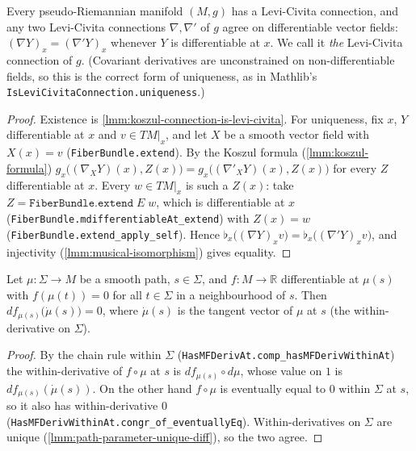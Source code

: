 \begin{theorem}
    \label{thrm:levi-civita-exists-unique}
    \leanok
    Every pseudo-Riemannian manifold $(M,g)$ has a Levi-Civita connection, and any two Levi-Civita connections $\nabla, \nabla'$ of $g$ agree on differentiable vector fields: $(\nabla Y)_x = (\nabla' Y)_x$ whenever $Y$ is differentiable at $x$. We call it \textit{the} Levi-Civita connection of $g$. (Covariant derivatives are unconstrained on non-differentiable fields, so this is the correct form of uniqueness, as in Mathlib's \texttt{IsLeviCivitaConnection.uniqueness}.)
\end{theorem}
\begin{proof}
    \leanok
    Existence is \ref{lmm:koszul-connection-is-levi-civita}. For uniqueness, fix $x$, $Y$ differentiable at $x$ and $v \in TM|_x$, and let $X$ be a smooth vector field with $X(x) = v$ (\texttt{FiberBundle.extend}). By the Koszul formula (\ref{lmm:koszul-formula}) $g_x\big((\nabla_X Y)(x), Z(x)\big) = g_x\big((\nabla'_X Y)(x), Z(x)\big)$ for every $Z$ differentiable at $x$. Every $w \in TM|_x$ is such a $Z(x)$: take $Z = \texttt{FiberBundle.extend}\;E\;w$, which is differentiable at $x$ (\texttt{FiberBundle.mdifferentiableAt\_extend}) with $Z(x) = w$ (\texttt{FiberBundle.extend\_apply\_self}). Hence $\flat_x\big((\nabla Y)_x v\big) = \flat_x\big((\nabla' Y)_x v\big)$, and injectivity (\ref{lmm:musical-isomorphism}) gives equality.
\end{proof}

\begin{lemma}
    \label{lmm:derivative-vanishes-along-path}
    \leanok
    Let $\mu : \Sigma \to M$ be a smooth path, $s \in \Sigma$, and $f : M \to \mathbb{R}$ differentiable at $\mu(s)$ with $f(\mu(t)) = 0$ for all $t \in \Sigma$ in a neighbourhood of $s$. Then $df_{\mu(s)}\big(\dot\mu(s)\big) = 0$, where $\dot\mu(s)$ is the tangent vector of $\mu$ at $s$ (the within-derivative on $\Sigma$).
\end{lemma}
\begin{proof}
    \leanok
    By the chain rule within $\Sigma$ (\texttt{HasMFDerivAt.comp\_hasMFDerivWithinAt}) the within-derivative of $f \circ \mu$ at $s$ is $df_{\mu(s)} \circ d\mu$, whose value on $1$ is $df_{\mu(s)}(\dot\mu(s))$. On the other hand $f \circ \mu$ is eventually equal to $0$ within $\Sigma$ at $s$, so it also has within-derivative $0$ (\texttt{HasMFDerivWithinAt.congr\_of\_eventuallyEq}). Within-derivatives on $\Sigma$ are unique (\ref{lmm:path-parameter-unique-diff}), so the two agree.
\end{proof}

